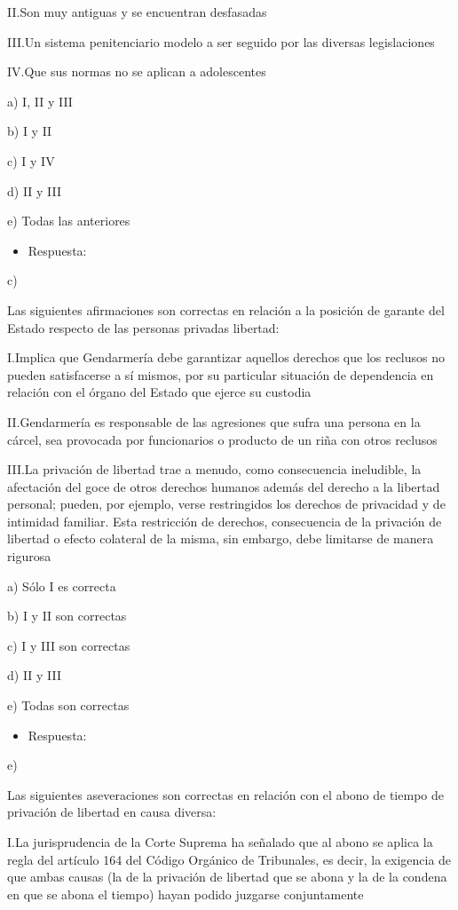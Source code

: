 \documentclass[letterpaper, 11pt]{article}
\begin{document}
II.Son muy antiguas y se encuentran desfasadas

III.Un sistema penitenciario modelo a ser seguido por las diversas legislaciones

IV.Que sus normas no se aplican a adolescentes

a) I, II y III

b) I y II

c) I y IV

d) II y III

e) Todas las anteriores

\begin{itemize}
\item Respuesta:
\end{itemize}
c)


Las siguientes afirmaciones son correctas en relación a la posición de garante
del Estado respecto de las personas privadas libertad:

I.Implica que Gendarmería debe garantizar aquellos derechos que los reclusos no
pueden satisfacerse a sí mismos, por su particular situación de dependencia en
relación con el órgano del Estado que ejerce su custodia

II.Gendarmería es responsable de las agresiones que sufra una persona en la cárcel,
sea provocada por funcionarios o producto de un riña con otros reclusos

III.La privación de libertad trae a menudo, como consecuencia ineludible, la
afectación del goce de otros derechos humanos además del derecho a la libertad
personal; pueden, por ejemplo, verse restringidos los derechos de privacidad y de
intimidad familiar. Esta restricción de derechos, consecuencia de la privación de
libertad o efecto colateral de la misma, sin embargo, debe limitarse de manera
rigurosa

a) Sólo I es correcta

b) I y II son correctas

c) I y III son correctas

d) II y III

e) Todas son correctas

\begin{itemize}
\item Respuesta:
\end{itemize}
e)

Las siguientes aseveraciones son correctas en relación con el abono de tiempo
de privación de libertad en causa diversa:

I.La jurisprudencia de la Corte Suprema ha señalado que al abono se aplica la regla
del artículo 164 del Código Orgánico de Tribunales, es decir, la exigencia de que
ambas causas (la de la privación de libertad que se abona y la de la condena en que
se abona el tiempo) hayan podido juzgarse conjuntamente
\end{document}
